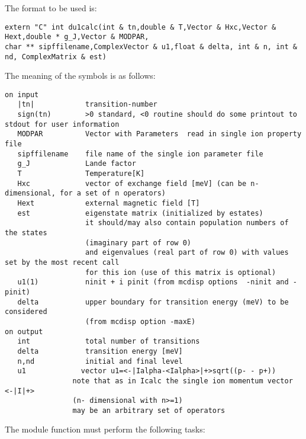 The format to be used is:
{\footnotesize
\begin{verbatim}
extern "C" int du1calc(int & tn,double & T,Vector & Hxc,Vector & Hext,double * g_J,Vector & MODPAR,
char ** sipffilename,ComplexVector & u1,float & delta, int & n, int & nd, ComplexMatrix & est)
\end{verbatim}

The meaning of the symbols is as follows:

\begin{verbatim}
on input
   |tn|            transition-number  
   sign(tn)        >0 standard, <0 routine should do some printout to stdout for user information
   MODPAR          Vector with Parameters  read in single ion property file
   sipffilename    file name of the single ion parameter file
   g_J             Lande factor
   T               Temperature[K]
   Hxc             vector of exchange field [meV] (can be n-dimensional, for a set of n operators)
   Hext            external magnetic field [T]
   est             eigenstate matrix (initialized by estates)
                   it should/may also contain population numbers of the states
				   (imaginary part of row 0)
                   and eigenvalues (real part of row 0) with values set by the most recent call
				   for this ion (use of this matrix is optional)
   u1(1)           ninit + i pinit (from mcdisp options  -ninit and -pinit)
   delta           upper boundary for transition energy (meV) to be considered
                   (from mcdisp option -maxE)
on output
   int             total number of transitions
   delta           transition energy [meV]
   n,nd            initial and final level
   u1             vector u1=<-|Ialpha-<Ialpha>|+>sqrt((p- - p+))                          
                note that as in Icalc the single ion momentum vector <-|I|+> 
				(n- dimensional with n>=1)
                may be an arbitrary set of operators
\end{verbatim}
}
The module function must perform the following tasks:

